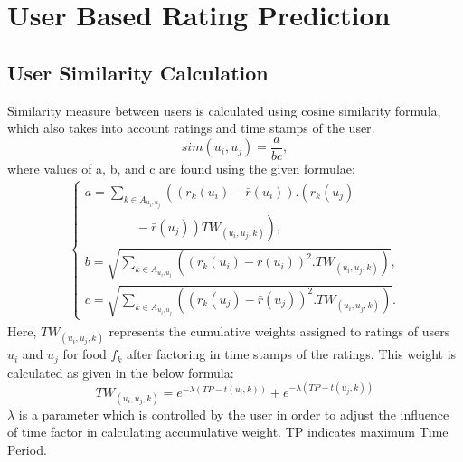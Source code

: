 \section{User Based Rating Prediction}
\subsection{User Similarity Calculation}
Similarity measure between users is calculated using cosine similarity formula, which also takes into account ratings and time stamps of the user\cite*{9775081}.
\begin{equation*}
    sim\left({u_{i},u_{j}}\right)=\frac {a}{bc}, \tag{1}
\end{equation*}
where values of a, b, and c are found using the given formulae\cite*{9775081, oulu_tdlgc}:
\begin{align*}
    \begin{cases}
        \displaystyle a=\sum \nolimits _{k\in A_{u_{i},u_{j}}} \left({\left({r_{k}\left({u_{i}}\right)-\bar {r}\left({u_{i}}\right)}\right). \left({r_{k}\left({u_{j}}\right)}\right.}\right.
        \\
            \displaystyle \left.{\left.{\qquad \qquad -\bar {r}\left({u_{j}}\right)}\right)TW_{\left({u_{i},u_{j},k}\right)}}\right),
        \\
        \displaystyle b=\sqrt {\sum \nolimits _{k\in A_{u_{i},u_{j}}}^{}\left({\left({r_{k}\left({u_{i}}\right)-\bar {r}\left({u_{i}}\right)}\right)^{2}.TW_{\left({u_{i},u_{j},k}\right)}}\right)},
        \\[0.5pc]
        \displaystyle c=\sqrt {\sum \nolimits _{k\in A_{u_{i},u_{j}}}^{}\left({\left({r_{k}\left({u_{j}}\right)-\bar {r}\left({u_{j}}\right)}\right)^{2}.TW_{\left({u_{i},u_{j},k}\right)}}\right)}.
    \end{cases}
\end{align*}
Here, $TW_{(u_{i}, u_{j}, k)}$ represents the cumulative weights assigned to ratings of users $u_i$ and $u_j$ for food $f_k$ after factoring in time stamps of the ratings\cite*{9775081}. This weight is calculated as given in the below formula\cite*{9775081}:
\begin{equation*}
    {TW}_{\left({u_{i},u_{j},k}\right)}=e^{-\lambda \left({TP-t\left({u_{i},k}\right)}\right)}+e^{-\lambda \left({TP-t\left({u_{j},k}\right) }\right)} \tag{2}
\end{equation*}
$\lambda$ is a parameter which is controlled by the user in order to adjust the influence of time factor in calculating accumulative weight. TP indicates maximum Time Period.

